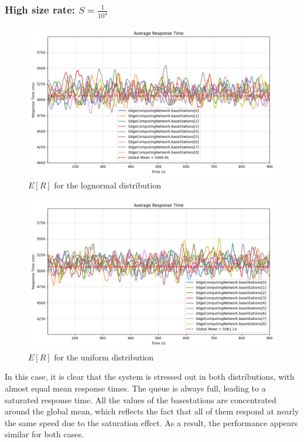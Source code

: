 \documentclass{report}
\begin{document}
\subsubsection*{High size rate: $S=\frac{1}{10^4}$}

\begin{figure}[H]
    \centering
    \includegraphics[width=\textwidth]{img/plots/log_1e4_B/resptime.png}
    \caption{$E[R]$ for the lognormal distribution}
\end{figure}

\begin{figure}[H]
    \centering
    \includegraphics[width=\textwidth]{img/plots/uni_1e4_B/resptime.png}
    \caption{$E[R]$ for the uniform distribution}
\end{figure}

In this case, it is clear that the system is stressed out in both distributions, with almost equal mean response times. The queue is always full, leading to a saturated response time.
All the values of the basestations are concentrated around the global mean, which reflects the fact that all of them respond at nearly the same speed due to the saturation effect.
As a result, the performance appears similar for both cases.
\end{document}
